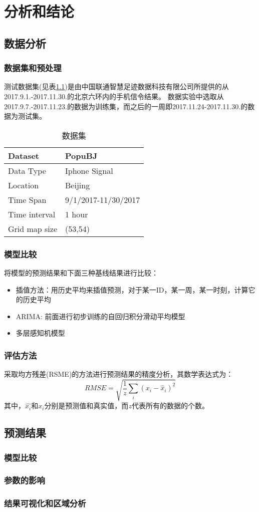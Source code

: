 
\chapter{分析和结论} %

\label{Chapter4} 
\section{数据分析}
\subsection{数据集和预处理}
测试数据集(见表\ref{table:data})是由中国联通智慧足迹数据科技有限公司所提供的从2017.9.1.-2017.11.30.的北京六环内的手机信令结果。 数据实验中选取从 2017.9.7.-2017.11.23.的数据为训练集，而之后的一周即2017.11.24-2017.11.30.的数据为测试集。
\begin{table}
\centering
\caption{数据集}
\label{table:data}
\begin{tabular}{p{}|p{}}
\hline
\hline
\textbf{Dataset} & \textbf{PopuBJ}\\
\hline
Data Type& Iphone Signal\\
\hline
Location & Beijing\\
\hline
Time Span & 9/1/2017-11/30/2017\\
\hline
Time interval & 1 hour\\
\hline
Grid map size & (53,54)\\
\hline

\end{tabular}
\end{table}
\subsection{模型比较}
将模型的预测结果和下面三种基线结果进行比较：
\begin{itemize}
	\item 插值方法：用历史平均来插值预测，对于某一ID，某一周，某一时刻，计算它的历史平均
	\item ARIMA: 前面进行初步训练的自回归积分滑动平均模型
	\item 多层感知机模型
\end{itemize}
\subsection{评估方法}
采取均方残差(RSME)的方法进行预测结果的精度分析，其数学表达式\cite{friedman2001elements}为：
\begin{equation}
R M S E = \sqrt { \frac { 1 } { z } \sum _ { i } \left( x _ { i } - \hat { x } _ { i } \right) ^ { 2 } }
\end{equation}
其中，$\hat{x_i}$和$x_i$分别是预测值和真实值，而$z$代表所有的数据的个数。
\section{预测结果}
\subsection{模型比较}
\subsection{参数的影响}
\subsection{结果可视化和区域分析}

